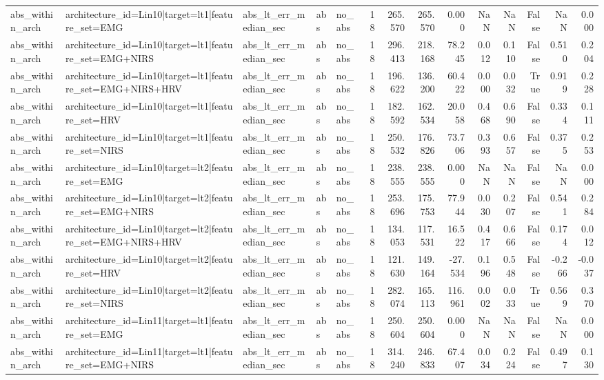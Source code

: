 \begin{table}
\begin{tabular}{lllllrrrrrrrrr}
abs_within_arch & architecture_id=Lin10|target=lt1|feature_set=EMG & abs_lt_err_median_sec & abs & no_abs & 18 & 265.570 & 265.570 & 0.000 & NaN & NaN & False & NaN & 0.000 \\
abs_within_arch & architecture_id=Lin10|target=lt1|feature_set=EMG+NIRS & abs_lt_err_median_sec & abs & no_abs & 18 & 296.413 & 218.168 & 78.245 & 0.012 & 0.110 & False & 0.510 & 0.204 \\
abs_within_arch & architecture_id=Lin10|target=lt1|feature_set=EMG+NIRS+HRV & abs_lt_err_median_sec & abs & no_abs & 18 & 196.622 & 136.200 & 60.422 & 0.000 & 0.032 & True & 0.919 & 0.228 \\
abs_within_arch & architecture_id=Lin10|target=lt1|feature_set=HRV & abs_lt_err_median_sec & abs & no_abs & 18 & 182.592 & 162.534 & 20.058 & 0.468 & 0.690 & False & 0.334 & 0.111 \\
abs_within_arch & architecture_id=Lin10|target=lt1|feature_set=NIRS & abs_lt_err_median_sec & abs & no_abs & 18 & 250.532 & 176.826 & 73.706 & 0.393 & 0.657 & False & 0.375 & 0.253 \\
abs_within_arch & architecture_id=Lin10|target=lt2|feature_set=EMG & abs_lt_err_median_sec & abs & no_abs & 18 & 238.555 & 238.555 & 0.000 & NaN & NaN & False & NaN & 0.000 \\
abs_within_arch & architecture_id=Lin10|target=lt2|feature_set=EMG+NIRS & abs_lt_err_median_sec & abs & no_abs & 18 & 253.696 & 175.753 & 77.944 & 0.030 & 0.207 & False & 0.541 & 0.284 \\
abs_within_arch & architecture_id=Lin10|target=lt2|feature_set=EMG+NIRS+HRV & abs_lt_err_median_sec & abs & no_abs & 18 & 134.053 & 117.531 & 16.522 & 0.417 & 0.666 & False & 0.174 & 0.012 \\
abs_within_arch & architecture_id=Lin10|target=lt2|feature_set=HRV & abs_lt_err_median_sec & abs & no_abs & 18 & 121.630 & 149.164 & -27.534 & 0.196 & 0.548 & False & -0.266 & -0.037 \\
abs_within_arch & architecture_id=Lin10|target=lt2|feature_set=NIRS & abs_lt_err_median_sec & abs & no_abs & 18 & 282.074 & 165.113 & 116.961 & 0.002 & 0.033 & True & 0.569 & 0.370 \\
abs_within_arch & architecture_id=Lin11|target=lt1|feature_set=EMG & abs_lt_err_median_sec & abs & no_abs & 18 & 250.604 & 250.604 & 0.000 & NaN & NaN & False & NaN & 0.000 \\
abs_within_arch & architecture_id=Lin11|target=lt1|feature_set=EMG+NIRS & abs_lt_err_median_sec & abs & no_abs & 18 & 314.240 & 246.833 & 67.407 & 0.034 & 0.224 & False & 0.497 & 0.130 \\

\end{tabular}
\end{table}
